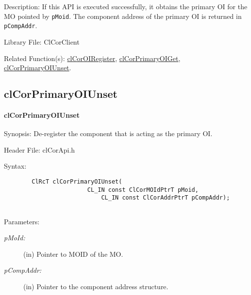 \begin{flushleft}
\begin{Desc}
\begin{description}
 \end{description}
\end{Desc}
\begin{Desc}
\item[Description:]
If this API is executed successfully, it obtains the primary OI for the MO pointed by {\tt{pMoid}}. The component address of the primary OI is returned 
in {\tt{pCompAddr}}.\end{Desc}
\begin{Desc}
\item[Library File:]Cl\-Cor\-Client\end{Desc}
\begin{Desc}
\item[Related Function(s):]\hyperlink{pagecor135}{clCorOIRegister}, \hyperlink{pagecor138}{clCorPrimaryOIGet},
\hyperlink{pagecor139}{clCorPrimaryOIUnset}.
\end{Desc}
\newpage



\subsection{clCorPrimaryOIUnset}
\hypertarget{pagecor139}{}\paragraph{cl\-Cor\-Primary\-OI\-Unset}\label{pagecor139}
\begin{Desc}
\item[Synopsis:]De-register the component that is acting as the primary OI. \end{Desc}
\begin{Desc}
\item[Header File:]clCorApi.h\end{Desc}
\begin{Desc}
\item[Syntax:]

\footnotesize\begin{verbatim}        ClRcT clCorPrimaryOIUnset(
						CL_IN const ClCorMOIdPtrT pMoid, 		
          					CL_IN const ClCorAddrPtrT pCompAddr);


\end{verbatim}
\normalsize
\end{Desc}
\begin{Desc}
\item[Parameters:]
\begin{description}
\item[{\em p\-MoId:}](in) Pointer to MOID of the MO.
\item[{\em p\-Comp\-Addr:}](in) Pointer to the component address structure.


\end{description}
\end{Desc}
\end{flushleft}
